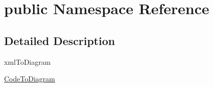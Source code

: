 \hypertarget{namespacepublic}{
\section{public Namespace Reference}
\label{namespacepublic}
}


\subsection{Detailed Description}
xmlToDiagram

\hyperlink{class_code_to_diagram}{CodeToDiagram} 

